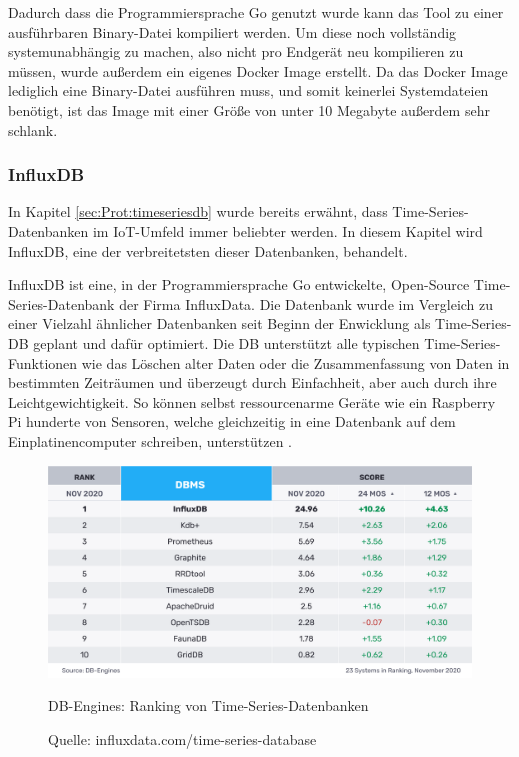 Dadurch dass die Programmiersprache Go genutzt wurde kann das Tool zu einer ausführbaren Binary-Datei kompiliert werden. Um diese noch vollständig system\-unabhängig zu machen, also nicht pro Endgerät neu kompilieren zu müssen, wurde außerdem ein eigenes Docker Image erstellt. Da das Docker Image lediglich eine Binary-Datei ausführen muss, und somit keinerlei Systemdateien benötigt, ist das Image mit einer Größe von unter 10 Megabyte außerdem sehr schlank.


\subsubsection{InfluxDB}
\label{sec:Prot:systemkomponenten2:influx}

In Kapitel \ref{sec:Prot:timeseriesdb} wurde bereits erwähnt, dass Time-Series-Datenbanken im IoT-Umfeld immer beliebter werden. In diesem Kapitel wird InfluxDB, eine der verbreitetsten dieser Datenbanken, behandelt.

InfluxDB ist eine, in der Programmiersprache Go entwickelte, Open-Source Time-Series-Datenbank der Firma InfluxData. Die Datenbank wurde im Vergleich zu einer Vielzahl ähnlicher Datenbanken seit Beginn der Enwicklung als Time-Series-DB geplant und dafür optimiert. Die DB unterstützt alle typischen Time-Series-Funktionen wie das Löschen alter Daten oder die Zusammenfassung von Daten in bestimmten Zeiträumen und überzeugt durch Einfachheit, aber auch durch ihre Leichtgewichtigkeit. So können selbst ressourcenarme Geräte wie ein Raspberry Pi hunderte von Sensoren, welche gleichzeitig in eine Datenbank auf dem Einplatinencomputer schreiben, unterstützen . 

\begin{figure}[H]
  \vspace{10pt}
  \begin{center}
    \includegraphics[width=1.0\textwidth]{./images/timeseries_ranking.png}
  \end{center}
  \vspace{-5pt}
  \caption[DB-Engines: Ranking von Time-Series-Datenbanken]{DB-Engines: Ranking von Time-Series-Datenbanken}
  \caption*{Quelle: {influxdata.com/time-series-database}}
  \label{fig:timeseries_ranking}
  \vspace{-10pt}
\end{figure}

